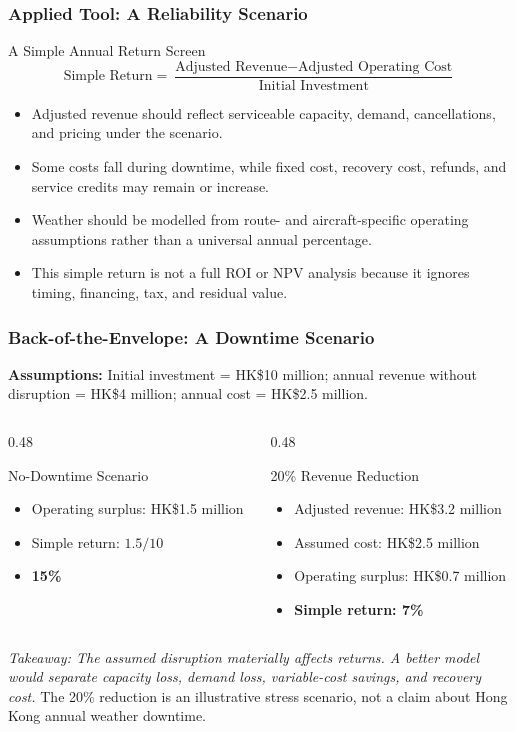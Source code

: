 \documentclass{beamer}
\begin{document}
\begin{frame}[t]
\frametitle{Applied Tool: A Reliability Scenario}
\begin{block}{A Simple Annual Return Screen}
\[
\text{Simple Return}
=
\frac{\text{Adjusted Revenue}-\text{Adjusted Operating Cost}}
{\text{Initial Investment}}
\]
\end{block}
\begin{itemize}
\item Adjusted revenue should reflect serviceable capacity, demand, cancellations, and pricing under the scenario.
\item Some costs fall during downtime, while fixed cost, recovery cost, refunds, and service credits may remain or increase.
\item Weather should be modelled from route- and aircraft-specific operating assumptions rather than a universal annual percentage.
\item This simple return is not a full ROI or NPV analysis because it ignores timing, financing, tax, and residual value.
\end{itemize}
\end{frame}

\begin{frame}[t,shrink=12]
\frametitle{Back-of-the-Envelope: A Downtime Scenario}
\textbf{Assumptions:} Initial investment = HK\$10 million; annual revenue without disruption = HK\$4 million; annual cost = HK\$2.5 million.
\begin{columns}[T]
\begin{column}{0.48\textwidth}\begin{block}{No-Downtime Scenario}
\begin{itemize}
\item Operating surplus: HK\$1.5 million
\item Simple return: $1.5/10$
\item \textbf{15\%}
\end{itemize}\end{block}\end{column}
\begin{column}{0.48\textwidth}\begin{block}{20\% Revenue Reduction}
\begin{itemize}
\item Adjusted revenue: HK\$3.2 million
\item Assumed cost: HK\$2.5 million
\item Operating surplus: HK\$0.7 million
\item \textbf{Simple return: 7\%}
\end{itemize}\end{block}\end{column}
\end{columns}
\textit{Takeaway: The assumed disruption materially affects returns. A better model would separate capacity loss, demand loss, variable-cost savings, and recovery cost.}
\vfill{\tiny The 20\% reduction is an illustrative stress scenario, not a claim about Hong Kong annual weather downtime.}
\end{frame}
\end{document}
